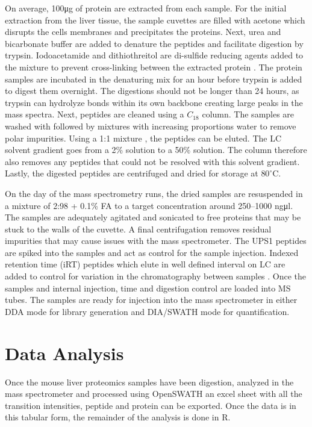 \documentclass[a4paper,11pt,twoside]{book}
\begin{document}
	On average, 100\si{\micro\gram} of protein are extracted from each sample. For the initial extraction from the liver tissue, the sample cuvettes are filled with acetone which disrupts the cells membranes and precipitates the proteins. Next, urea and bicarbonate buffer are added to denature the peptides and facilitate digestion by trypsin. Iodoacetamide and dithiothreitol are di-sulfide reducing agents added to the mixture to prevent cross-linking between the extracted protein \citep{Voet2011Biochemistry}. The protein samples are incubated in the denaturing mix for an hour before trypsin is added to digest them overnight. The digestions should not be longer than 24 hours, as trypsin can hydrolyze bonds within its own backbone creating large peaks in the mass spectra. Next, peptides are cleaned using a $C_18$ column. The samples are washed with  followed by mixtures  with increasing proportions water to remove polar impurities. Using a 1:1 mixture , the peptides can be eluted. The LC solvent gradient goes from a 2\%  solution to a 50\% solution. The column therefore also removes any peptides that could not be resolved with this solvent gradient. Lastly, the digested peptides are centrifuged and dried for storage at $80^\circ$C. 
	
	On the day of the mass spectrometry runs, the dried samples are resuspended in a mixture of 2:98 + 0.1\% FA to a target concentration around 250–1000 ng\si{\micro\litre}. The samples are adequately agitated and sonicated to free proteins that may be stuck to the walls of the cuvette. A final centrifugation removes residual impurities that may cause issues with the mass spectrometer. The UPS1 peptides are spiked into the samples and act as control for the sample injection. Indexed retention time (iRT) peptides which elute in well defined interval on LC are added to control for variation in the chromatography between samples \citep{Escher2012UsingPeptides.}. Once the samples and internal injection, time and digestion control are loaded into MS tubes. The samples are ready for injection into the mass spectrometer in either DDA mode for library generation and DIA/SWATH mode for quantification.
	
	\section{Data Analysis}

	Once the mouse liver proteomics samples have been digestion, analyzed in the mass spectrometer and processed using OpenSWATH an excel sheet with all the transition intensities, peptide and protein can be exported. Once the data is in this tabular form, the remainder of the analysis is done in R.
	
\end{document}
